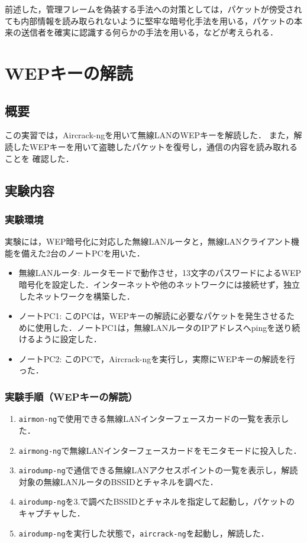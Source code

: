 前述した，管理フレームを偽装する手法への対策としては，パケットが傍受されても内部情報を読み取られないように堅牢な暗号化手法を用いる，パケットの本来の送信者を確実に認識する何らかの手法を用いる，などが考えられる．

\section{WEPキーの解読}

\subsection{概要}

この実習では，Aircrack-ngを用いて無線LANのWEPキーを解読した．
また，解読したWEPキーを用いて盗聴したパケットを復号し，通信の内容を読み取れることを
確認した．

\subsection{実験内容}

\subsubsection{実験環境}

実験には，WEP暗号化に対応した無線LANルータと，無線LANクライアント機能を備えた2台のノートPCを用いた．

\begin{itemize}
\itemsep1pt\parskip0pt
\item
  無線LANルータ:
  ルータモードで動作させ，13文字のパスワードによるWEP暗号化を設定した．インターネットや他のネットワークには接続せず，独立したネットワークを構築した．
\item
  ノートPC1:
  このPCは，WEPキーの解読に必要なパケットを発生させるために使用した．ノートPC1は，無線LANルータのIPアドレスへpingを送り続けるように設定した．
\item
  ノートPC2:
  このPCで，Aircrack-ngを実行し，実際にWEPキーの解読を行った．
\end{itemize}

\subsubsection{実験手順（WEPキーの解読）}

\begin{enumerate}
\def\labelenumi{\arabic{enumi}.}
\itemsep1pt\parskip0pt
\item
  \texttt{airmon-ng}で使用できる無線LANインターフェースカードの一覧を表示した．
\item
  \texttt{airmong-ng}で無線LANインターフェースカードをモニタモードに投入した．
\item
  \texttt{airodump-ng}で通信できる無線LANアクセスポイントの一覧を表示し，解読対象の無線LANルータのBSSIDとチャネルを調べた．
\item
  \texttt{airodump-ng}を3.で調べたBSSIDとチャネルを指定して起動し，パケットのキャプチャした．
\item
  \texttt{airodump-ng}を実行した状態で，\texttt{aircrack-ng}を起動し，解読した．
\end{enumerate}

